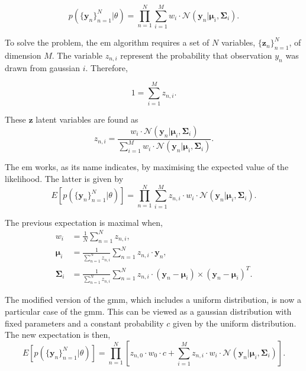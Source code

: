 \begin{equation}
p(\{\mathbf{y}_n\}_{n=1}^N|\theta)=\prod_{n=1}^N {\sum_{i=1} ^M {w_i\cdot \mathcal{N}(\mathbf{y}_n|\boldsymbol{\mu}_i,\boldsymbol{\Sigma}_i)}}.
\end{equation}

To solve the problem, the \gls{em} algorithm requires  a set of $N$ variables, $\{\boldsymbol{z}_n\}_{n=1}^N$, of dimension $M$. The variable $z_{n,i}$ represent the probability that observation $y_n$ was drawn from gaussian $i$. Therefore,

\begin{equation}
1=\sum_{i=1}^M z_{n,i}.
\end{equation}

These $\boldsymbol{z}$ latent variables are found as
\begin{equation}
z_{n,i}= \frac{w_i\cdot \mathcal{N}(\mathbf{y}_n|\boldsymbol{\mu}_i,\boldsymbol{\Sigma}_i)}{\sum_{i=1}^M w_i\cdot \mathcal{N}(\mathbf{y}_n|\boldsymbol{\mu}_i,\boldsymbol{\Sigma}_i)}.
\end{equation}

The \gls{em} works, as its name indicates, by maximising the expected value of the likelihood. The latter is given by
\begin{equation}
E[p(\{\mathbf{y}_n\}_{n=1}^N|\theta)]=\prod_{n=1}^N {\sum_{i=1} ^M {z_{n,i}\cdot w_i\cdot \mathcal{N}(\mathbf{y}_n|\boldsymbol{\mu}_i,\boldsymbol{\Sigma}_i)}}.
\end{equation}

The previous expectation is maximal when,
\begin{align}
w_i &= \frac{1}{N} \sum_{n=1}^N z_{n,i}, \\
\boldsymbol{\mu}_i &= \frac{1}{\sum_{n=1}^N z_{n,i}} \sum_{n=1}^N z_{n,i}\cdot \mathbf{y}_n,\\
\boldsymbol{\Sigma}_i &= \frac{1}{\sum_{n=1}^N z_{n,i}} \sum_{n=1}^N z_{n,i}\cdot (\mathbf{y}_n - \boldsymbol{\mu}_i)\times(\mathbf{y}_n-\boldsymbol{\mu}_i)^T.
\end{align}

The modified version of the \gls{gmm}, which includes a uniform distribution, is now a particular case of the \gls{gmm}. This can be viewed as a gaussian distribution with fixed parameters and a constant probability $c$ given by the uniform distribution. The new expectation is then,
\begin{equation}
E[p(\{\mathbf{y}_n\}_{n=1}^N|\theta)]=\prod_{n=1}^N {\left[z_{n,0}\cdot w_0 \cdot c + \sum_{i=1} ^M {z_{n,i}\cdot w_i\cdot \mathcal{N}(\mathbf{y}_n|\boldsymbol{\mu}_i,\boldsymbol{\Sigma}_i)}\right]}.
\end{equation}

